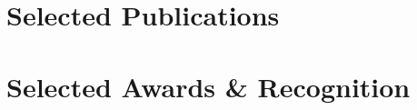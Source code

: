 \documentclass[10pt, letterpaper]{article}
\newenvironment{highlights}{
    \begin{itemize}[
        topsep=0.10 cm,
        parsep=0.10 cm,
        partopsep=0pt,
        itemsep=0pt,
        leftmargin=0 cm + 10pt
    ]
}{
    \end{itemize}
} %
\newenvironment{onecolentry}{
    \begin{adjustwidth}{
        0 cm + 0.00001 cm
    }{
        0 cm + 0.00001 cm
    }
}{
    \end{adjustwidth}
} %
\begin{document}
    
    \section{Selected Publications}

    \begingroup
    \setlength{\itemsep}{0.5em}
    \nocite{*}
    
    
    \endgroup


    \section{Selected Awards \& Recognition}

\end{document}
